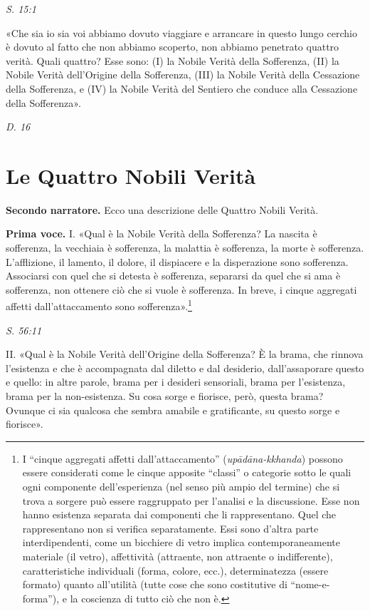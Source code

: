 \emph{S. 15:1}


«Che sia io sia voi abbiamo dovuto viaggiare e arrancare in questo lungo
cerchio è dovuto al fatto che non abbiamo scoperto, non abbiamo
penetrato quattro verità. Quali quattro? Esse sono: (I) la Nobile Verità
della Sofferenza, (II) la Nobile Verità dell’Origine della Sofferenza,
(III) la Nobile Verità della Cessazione della Sofferenza, e (IV) la
Nobile Verità del Sentiero che conduce alla Cessazione della
Sofferenza».


\emph{D. 16}


\hypertarget{x-le-quattro-nobili-verità}{\section*{Le Quattro Nobili Verità}}
\textbf{Secondo narratore.} Ecco una descrizione delle Quattro Nobili Verità.


\textbf{Prima voce.} I. «Qual è la Nobile Verità della Sofferenza? La nascita è
sofferenza, la vecchiaia è sofferenza, la malattia è sofferenza, la
morte è sofferenza. L’afflizione, il lamento, il dolore, il dispiacere e
la disperazione sono sofferenza. Associarsi con quel che si detesta è
sofferenza, separarsi da quel che si ama è sofferenza, non ottenere ciò
che si vuole è sofferenza. In breve, i cinque aggregati affetti
dall’attaccamento sono sofferenza».\footnote{I “cinque aggregati affetti dall’attaccamento” (\emph{upādāna-kkhanda}) possono essere considerati come le cinque apposite “classi” o categorie sotto le quali ogni componente dell’esperienza (nel senso più ampio del termine) che si trova a sorgere può essere raggruppato per l’analisi e la discussione. Esse non hanno esistenza separata dai componenti che li rappresentano. Quel che rappresentano non si verifica separatamente. Essi sono d’altra parte interdipendenti, come un bicchiere di vetro implica contemporaneamente materiale (il vetro), affettività (attraente, non attraente o indifferente), caratteristiche individuali (forma, colore, ecc.), determinatezza (essere formato) quanto all’utilità (tutte cose che sono costitutive di “nome-e-forma”), e la coscienza di tutto ciò che non è.}


\emph{S. 56:11}


II. «Qual è la Nobile Verità dell’Origine della Sofferenza? È la brama,
che rinnova l’esistenza e che è accompagnata dal diletto e dal
desiderio, dall’assaporare questo e quello: in altre parole, brama per i
desideri sensoriali, brama per l’esistenza, brama per la non-esistenza.
Su cosa sorge e fiorisce, però, questa brama? Ovunque ci sia qualcosa
che sembra amabile e gratificante, su questo sorge e fiorisce».


